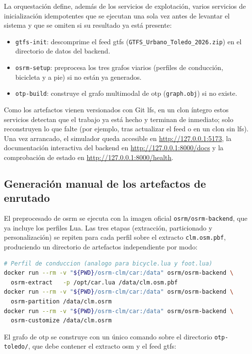 La orquestación define, además de los servicios de explotación, varios servicios de inicialización idempotentes que se ejecutan una sola vez antes de levantar el sistema y que se omiten si su resultado ya está presente:
\begin{itemize}
  \item \texttt{gtfs-init}: descomprime el feed \gls{gtfs} (\texttt{GTFS\_Urbano\_Toledo\_2026.zip}) en el directorio de datos del backend.
  \item \texttt{osrm-setup}: preprocesa los tres grafos viarios (perfiles de conducción, bicicleta y a pie) si no están ya generados.
  \item \texttt{otp-build}: construye el grafo multimodal de \acrlong{otp} (\texttt{graph.obj}) si no existe.
\end{itemize}

Como los artefactos vienen versionados con Git \gls{lfs}, en un clon íntegro estos servicios detectan que el trabajo ya está hecho y terminan de inmediato; solo reconstruyen lo que falte (por ejemplo, tras actualizar el feed o en un clon sin \gls{lfs}). Una vez arrancado, el simulador queda accesible en \url{http://127.0.0.1:5173}, la documentación interactiva del backend en \url{http://127.0.0.1:8000/docs} y la comprobación de estado en \url{http://127.0.0.1:8000/health}.

\subsection{Generación manual de los artefactos de enrutado}

El preprocesado de \gls{osrm} se ejecuta con la imagen oficial \texttt{osrm/osrm-backend}, que ya incluye los perfiles Lua. Las tres etapas (extracción, particionado y personalización) se repiten para cada perfil sobre el extracto \texttt{clm.osm.pbf}, produciendo un directorio de artefactos independiente por modo:

\begin{lstlisting}[language=bash]
# Perfil de conduccion (analogo para bicycle.lua y foot.lua)
docker run --rm -v "${PWD}/osrm-clm/car:/data" osrm/osrm-backend \
  osrm-extract   -p /opt/car.lua /data/clm.osm.pbf
docker run --rm -v "${PWD}/osrm-clm/car:/data" osrm/osrm-backend \
  osrm-partition /data/clm.osrm
docker run --rm -v "${PWD}/osrm-clm/car:/data" osrm/osrm-backend \
  osrm-customize /data/clm.osrm
\end{lstlisting}

El grafo de \gls{otp} se construye con un único comando sobre el directorio \texttt{otp-toledo/}, que debe contener el extracto \gls{osm} y el feed \gls{gtfs}:

